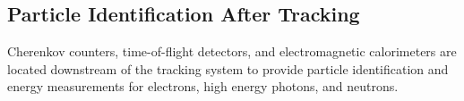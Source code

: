 \documentclass[final,3p,twocolumn]{elsarticle}
\begin{document}
\subsection{Particle Identification After Tracking}

Cherenkov counters, time-of-flight detectors, and electromagnetic calorimeters are located downstream of the
tracking system to provide particle identification and energy measurements for electrons, high energy photons,
and neutrons.  


\end{document}
